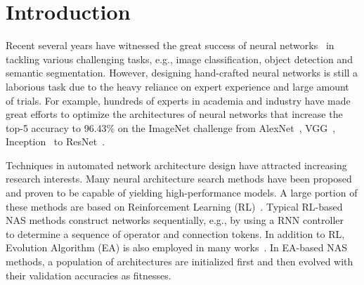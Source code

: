 \documentclass[10pt,twocolumn,letterpaper]{article}
\begin{document}
\section{Introduction}
Recent several years have witnessed the great success of neural networks~\cite{szegedy2015going,he2016deep,szegedy2016rethinking,szegedy2017inception,huang2017densely} in tackling various challenging tasks, e.g., image classification, object detection and semantic segmentation.
 However, designing hand-crafted neural networks is still a laborious task due to the heavy reliance on expert experience and large amount of trials. For example,
 hundreds of experts in academia and industry have made great efforts to optimize the architectures of neural networks that increase the top-5 accuracy to 96.43\% on the ImageNet challenge from AlexNet~\cite{krizhevsky2012imagenet}, VGG~\cite{simonyan2014very}, Inception~\cite{szegedy2015going} to ResNet~\cite{he2016deep}. 
 
Techniques in automated network architecture design have attracted increasing research interests.
Many neural architecture search methods %
 have been proposed and proven to be capable of yielding high-performance models.
A large portion of these methods are based on Reinforcement Learning (RL)~\cite{zoph2017learning,cai2018efficient,zoph2016neural}. Typical RL-based NAS methods construct networks sequentially, e.g., by using a RNN controller~\cite{zoph2017learning,pham2018efficient,zoph2016neural} to determine a sequence of operator and connection tokens.
In addition to RL, Evolution Algorithm (EA) is also employed in many works~\cite{Real2018Regularized,stanley2002evolving,real2017large,miikkulainen2017evolving,xie2017genetic}.
In EA-based NAS methods, a population of architectures are initialized first and then evolved with their validation accuracies as fitnesses. 
\end{document}
